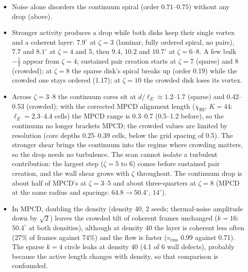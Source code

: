 \documentclass[11pt,a4paper]{article}
\newcommand{\half}{\tfrac12}
\begin{document}
\begin{itemize}
  \item Noise alone disorders the continuum spiral (order $0.71$--$0.75$) without any drop (above).
  \item Stronger activity produces a drop while both disks keep their single vortex and a coherent layer: $7.9^\circ$ at $\zeta=3$ (laminar, fully ordered spiral, no pairs),
        $7.7$ and $8.1^\circ$ at $\zeta=4$ and 5, then $9.4$, $10.2$ and $10.7^\circ$ at $\zeta=6$--8. A few bulk $-\half$ appear from $\zeta=4$; sustained pair creation starts at
        $\zeta=7$ (sparse) and 8 (crowded); at $\zeta=8$ the sparse disk's spiral breaks up (order 0.19) while the crowded one stays ordered (1.17); at $\zeta=10$ the crowded disk loses its vortex.
  \item Across $\zeta=3$--8 the continuum cores sit at $d/\ell_E\approx1.2$--1.7 (sparse) and 0.42--0.53 (crowded); with the corrected MPCD alignment length ($\chi_\mathrm{HI}$, $K=44$:
        $\ell_E=2.3$--4.4 cells) the MPCD range is 0.3--0.7 (0.5--1.2 before), so the continuum no longer brackets MPCD; the crowded values are
        limited by resolution (core depths 0.25--0.39 cells, below the grid spacing of 0.5). The stronger shear brings the continuum into the regime where crowding matters, so the drop
        needs no turbulence. The scan cannot isolate a turbulent contribution: the largest step ($\zeta=5$ to 6) comes before sustained pair creation, and the wall shear grows with $\zeta$ throughout.
        The continuum drop is about half of MPCD's at $\zeta=3$--5 and about three-quarters at $\zeta=8$ (MPCD at the same radius and spacings: $64.8\to50.4^\circ$, $14^\circ$).
  \item In MPCD, doubling the density (density 40, 2 seeds; thermal-noise amplitude down by $\sqrt2$) leaves the crowded tilt of coherent frames unchanged ($k=16$: $50.4^\circ$ at both
        densities), although at density 40 the layer is coherent less often (27\% of frames against 74\%) and the flow is faster ($v_\mathrm{rms}$ 0.99 against 0.71). The sparse $k=4$ circle leaks at density 40
        (4.1 of 6 wall defects), probably because the active length changes with density, so that comparison is confounded.
\end{itemize}
\end{document}
